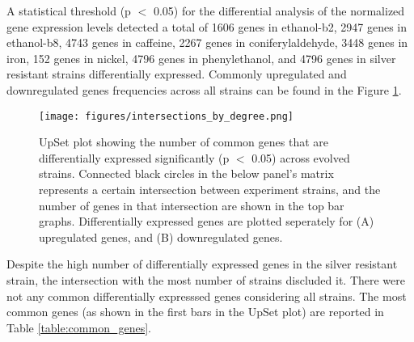 A statistical threshold (p $<$ 0.05) for the differential analysis of the normalized gene expression levels detected a total of 1606 genes in ethanol-b2, 2947 genes in ethanol-b8, 4743 genes in caffeine, 2267 genes in coniferylaldehyde, 3448 genes in iron, 152 genes in nickel, 4796 genes in phenylethanol, and 4796 genes in silver resistant strains differentially expressed. Commonly upregulated and downregulated genes frequencies across all strains can be found in the Figure \ref{fig:intersections_by_degree}.



\begin{figure}[H]
  \begin{center}
  \texttt{[image: figures/intersections\_by\_degree.png]}
  \caption[UpSet plot showing the number of common genes that are differentially expressed significantly]{UpSet plot showing the number of common genes that are differentially expressed significantly (p $<$ 0.05) across evolved strains. Connected black circles in the below panel's matrix represents a certain intersection between experiment strains, and the number of genes in that intersection are shown in the top bar graphs. Differentially expressed genes are plotted seperately for (A) upregulated genes, and (B) downregulated genes.}
  \label{fig:intersections_by_degree}
  \end{center}
\end{figure}

Despite the high number of differentially expressed genes in the silver resistant strain, the intersection with the most number of strains discluded it. There were not any common differentially expresssed genes considering all strains. The most common genes (as shown in the first bars in the UpSet plot) are reported in Table \ref{table:common_genes}.

